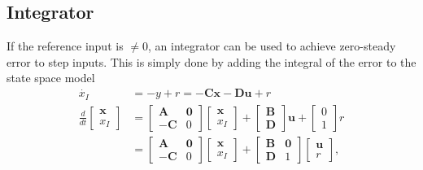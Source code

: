 \textbf{} 

\subsection{Integrator}
If the reference input is $\neq 0$, an integrator can be used to achieve zero-steady error to step inputs.
This is simply done by adding the integral of the error to the state space model
\noindent\begin{align*}
    \dot{x_I} & =-y+r =  -\mathbf{Cx} - \mathbf{Du} + r \\
    \frac d{dt}
    \begin{bmatrix}
        \mathbf{x} \\
        x_I
    \end{bmatrix}
              & =\begin{bmatrix}
                     \mathbf{A}  & \mathbf{0} \\
                     -\mathbf{C} & 0
                 \end{bmatrix}
    \begin{bmatrix}
        \mathbf{x} \\
        x_I
    \end{bmatrix}
    +\begin{bmatrix}
         \mathbf{B} \\
         \mathbf{D}
     \end{bmatrix}
    \mathbf{u}+
    \begin{bmatrix}
        0 \\
        1
    \end{bmatrix}
    r                                                   \\
              & =\begin{bmatrix}
                     \mathbf{A}  & \mathbf{0} \\
                     -\mathbf{C} & 0
                 \end{bmatrix}
    \begin{bmatrix}
        \mathbf{x} \\
        x_I
    \end{bmatrix}
    +\begin{bmatrix}
         \mathbf{B} & \mathbf{0} \\
         \mathbf{D} & 1
     \end{bmatrix}
    \begin{bmatrix}
        \mathbf{u} \\
        r
    \end{bmatrix},
\end{align*}
